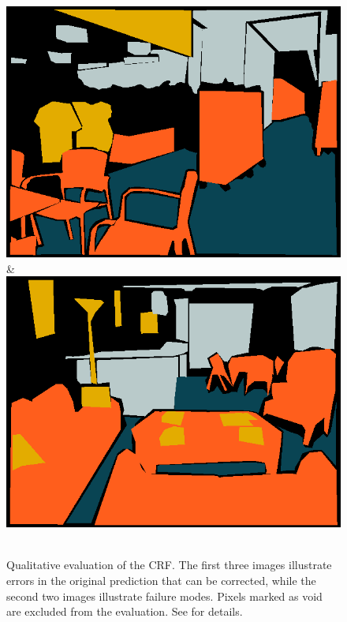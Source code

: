 \begin{figure}
\begin{tabu}
    \includegraphics[width=\linewidth]{nyu/images/00118_gt.png}&%
    \includegraphics[width=\linewidth]{nyu/images/01203_gt.png}\\
    \vspace{3mm}\\
    \end{tabu}
\caption{%
Qualitative evaluation of the CRF\@.
The first three images illustrate errors in the original prediction that can be corrected, while
the second two images illustrate failure modes. Pixels marked as void
are excluded from the evaluation. See  for details.
}
\end{figure}

